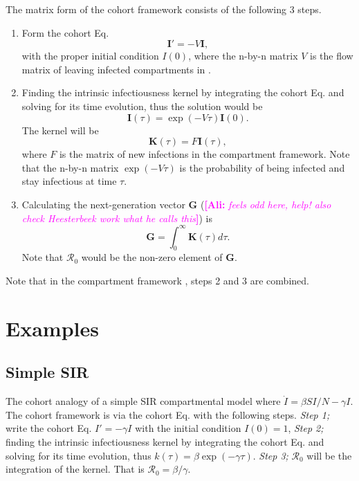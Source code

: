 \documentclass[12pt]{article}
\newcommand{\ali}[1]{\comment{magenta}{Ali}{#1}}
\DeclareRobustCommand\_{\ifmmode\expandafter\subtxt\else\textunderscore\fi}
\newcommand{\R}{\ensuremath{\mathcal{R}_0}}
\renewcommand{\vec}[1]{\ensuremath{\mathbf{#1}}} %
\newcommand{\comment}{\showcomment}
\newcommand{\showcomment}[3]{\textcolor{#1}{\textbf{[#2: }\textsl{#3}\textbf{]}}}
\theoremstyle{definition} %
\begin{document}
The matrix form of the cohort framework consists of the following 3 steps.
\begin{enumerate}[{\it Step 1.}]
\item
Form the cohort Eq. 
\begin{equation}
\label{eq:cohort}
\vec I'=-V \vec I,
\end{equation}
 with the proper initial condition $I(0)$, where the n-by-n matrix $V$ is the flow matrix of leaving infected compartments in \cite{van2002reproduction}.

\item 
Finding the intrinsic infectiousness kernel by integrating the cohort Eq. and solving for its time evolution, thus
the solution would be 
\begin{equation}
\label{eq:I}
\vec I(\tau) = \exp(-V\tau) \vec I(0).
\end{equation}
The kernel will be 
\begin{equation}
\label{eq:kernel}
\vec K(\tau) = F \vec I(\tau), 
\end{equation}
where $F$ is the matrix of new infections in the compartment framework.
Note that the n-by-n matrix $\exp(-V\tau)$ is the probability of being infected and stay infectious at time $\tau$. 

\item
Calculating the next-generation vector $\vec G$ (\ali{feels odd here, help! also check Heesterbeek work what he calls this}) is
\begin{equation}
\label{eq:ng} %
\vec G = \int_0^\infty \vec K(\tau) d\tau.
\end{equation}
Note that $\R$ would be the non-zero element of $\vec G$.
\end{enumerate}
Note that in the compartment framework \citep{van2002reproduction}, steps 2 and 3 are combined.
\section{Examples}

\subsection {Simple SIR}
The cohort analogy of a simple SIR compartmental model where $\dot I=\beta S I/N-\gamma I$. The cohort framework is via the cohort Eq. with the following steps.
{\it Step 1;} write the cohort Eq. $I'=-\gamma I$ with the initial condition $I(0)=1$, 
{\it Step 2;} finding the intrinsic infectiousness kernel by integrating the cohort Eq. and solving for its time evolution, thus $k(\tau)=\beta \exp(-\gamma \tau)$.
{\it Step 3;} $\R$ will be the integration of the kernel. That is $\R=\beta/\gamma$. 
\end{document}

